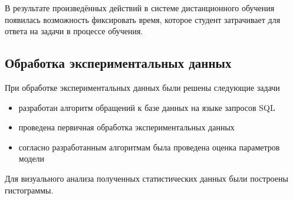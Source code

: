 В результате произведённых действий в системе дистанционного обучения появилась возможность фиксировать время, которое студент затрачивает для ответа на задачи в процессе обучения.

\subsection{Обработка экспериментальных данных}

При обработке экспериментальных данных были решены следующие задачи

\begin{itemize}
\item разработан алгоритм обращений к базе данных на языке запросов SQL
\item проведена первичная обработка экспериментальных данных
\item согласно разработанным алгоритмам была проведена оценка параметров модели
\end{itemize}

Для визуального анализа полученных статистических данных были пос\-троены гисто\-граммы.